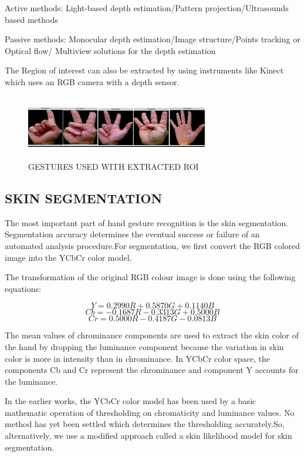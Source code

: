 \documentclass[conference]{IEEEtran}
\begin{document}
Active methods:
Light-based depth estimation/Pattern projection/Ultrasounds based methods

Passive methods:
Monocular depth estimation/Image structure/Points tracking or Optical flow/ Multiview solutions for the depth estimation

The Region of interest can also be extracted by using instruments like Kinect which uses an RGB camera with a depth sensor.

\begin{figure}[h!]
	\centering
	\includegraphics[width = 8cm, height = 2.8cm]{StandardDataset}
	\caption{GESTURES USED WITH EXTRACTED ROI}
\end{figure}

\subsection{SKIN SEGMENTATION}

The most important part of hand gesture recognition is the skin segmentation. Segmentation accuracy determines the eventual success or failure of an automated analysis procedure.For segmentation, we first convert the RGB colored image into the YCbCr color model.

The transformation of the original RGB colour image is done using
the following equations:

\begin{equation}
 Y = 0.2990R + 0.5870G + 0.1140B
\end{equation}
\begin{equation}
 Cb = -0.1687R - 0.3313G + 0.5000B
\end{equation}
\begin{equation}
 Cr = 0.5000R - 0.4187G - 0.0813B
\end{equation}


The mean values of chrominance components are used to extract the skin color of the hand by dropping the luminance component because the variation in skin color is more in intensity than in chrominance. In YCbCr color space, the components Cb and Cr represent the chrominance and component Y accounts for the luminance.

In the earlier works, the YCbCr color model has been used by a basic mathematic operation of thresholding on chromaticity and luminance values. No method has yet been settled which determines the thresholding accurately.So, alternatively, we use a modified approach called a skin likelihood model for skin segmentation.
\end{document}
